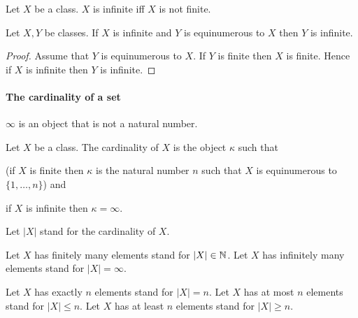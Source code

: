 \documentclass[10pt]{article}
\begin{document}
  \begin{forthel}
    \begin{definition}
      Let $X$ be a class.
      $X$ is infinite iff $X$ is not finite.
    \end{definition}
  \end{forthel}

  \begin{forthel}
    \begin{proposition}
      Let $X, Y$ be classes.
      If $X$ is infinite and $Y$ is equinumerous to $X$ then $Y$ is infinite.
    \end{proposition}
    \begin{proof}
      Assume that $Y$ is equinumerous to $X$.
      If $Y$ is finite then $X$ is finite.
      Hence if $X$ is infinite then $Y$ is infinite.
    \end{proof}
  \end{forthel}


  \paragraph{The cardinality of a set}

  \begin{forthel}
    \begin{signature}
      $\infty$ is an object that is not a natural number.
    \end{signature}
  \end{forthel}

  \begin{forthel}
    \begin{definition}
      Let $X$ be a class.
      The cardinality of $X$ is the object $\kappa$ such that

      (if $X$ is finite then $\kappa$ is the natural number $n$ such that $X$ is
      equinumerous to $\{ 1, \dots, n \}$) and

      if $X$ is infinite then $\kappa = \infty$.
    \end{definition}

    Let $|X|$ stand for the cardinality of $X$.

    Let $X$ has finitely many elements stand for $|X| \in \mathbb{N}$.
    Let $X$ has infinitely many elements stand for $|X| = \infty$.

    Let $X$ has exactly $n$ elements stand for $|X| = n$.
    Let $X$ has at most $n$ elements stand for $|X| \leq n$.
    Let $X$ has at least $n$ elements stand for $|X| \geq n$.
  \end{forthel}
\end{document}
